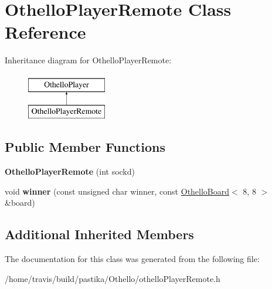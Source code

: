 \hypertarget{classOthelloPlayerRemote}{\section{Othello\-Player\-Remote Class Reference}
\label{classOthelloPlayerRemote}
}
Inheritance diagram for Othello\-Player\-Remote\-:\begin{figure}[H]
\begin{center}
\leavevmode
\includegraphics[height=2.000000cm]{classOthelloPlayerRemote}
\end{center}
\end{figure}
\subsection*{Public Member Functions}
\begin{DoxyCompactItemize}
\item 
\hypertarget{classOthelloPlayerRemote_ae06abf8567284ffdefe13da89fe99138}{{\bfseries Othello\-Player\-Remote} (int sockd)}\label{classOthelloPlayerRemote_ae06abf8567284ffdefe13da89fe99138}

\item 
\hypertarget{classOthelloPlayerRemote_a6d7f6c0544aa6a6eb219e69d6c6d2e41}{void {\bfseries winner} (const unsigned char winner, const \hyperlink{classOthelloBoard}{Othello\-Board}$<$ 8, 8 $>$ \&board)}\label{classOthelloPlayerRemote_a6d7f6c0544aa6a6eb219e69d6c6d2e41}

\end{DoxyCompactItemize}
\subsection*{Additional Inherited Members}


The documentation for this class was generated from the following file\-:\begin{DoxyCompactItemize}
\item 
/home/travis/build/pastika/\-Othello/othello\-Player\-Remote.\-h\end{DoxyCompactItemize}

